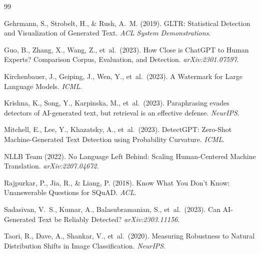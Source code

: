 \documentclass[11pt,a4paper]{article}
\begin{document}

\begin{thebibliography}{99}

Gehrmann, S., Strobelt, H., \& Rush, A.~M. (2019).
\newblock GLTR: Statistical Detection and Visualization of Generated Text.
\newblock \emph{ACL System Demonstrations}.

Guo, B., Zhang, X., Wang, Z., et~al.\ (2023).
\newblock How Close is ChatGPT to Human Experts? Comparison Corpus, Evaluation, and Detection.
\newblock \emph{arXiv:2301.07597}.

Kirchenbauer, J., Geiping, J., Wen, Y., et~al.\ (2023).
\newblock A Watermark for Large Language Models.
\newblock \emph{ICML}.

Krishna, K., Song, Y., Karpinska, M., et~al.\ (2023).
\newblock Paraphrasing evades detectors of AI-generated text, but retrieval is an effective defense.
\newblock \emph{NeurIPS}.

Mitchell, E., Lee, Y., Khazatsky, A., et~al.\ (2023).
\newblock DetectGPT: Zero-Shot Machine-Generated Text Detection using Probability Curvature.
\newblock \emph{ICML}.

NLLB Team (2022).
\newblock No Language Left Behind: Scaling Human-Centered Machine Translation.
\newblock \emph{arXiv:2207.04672}.

Rajpurkar, P., Jia, R., \& Liang, P. (2018).
\newblock Know What You Don't Know: Unanswerable Questions for SQuAD.
\newblock \emph{ACL}.

Sadasivan, V.~S., Kumar, A., Balasubramanian, S., et~al.\ (2023).
\newblock Can AI-Generated Text be Reliably Detected?
\newblock \emph{arXiv:2303.11156}.

Taori, R., Dave, A., Shankar, V., et~al.\ (2020).
\newblock Measuring Robustness to Natural Distribution Shifts in Image Classification.
\newblock \emph{NeurIPS}.

\end{thebibliography}
\end{document}
